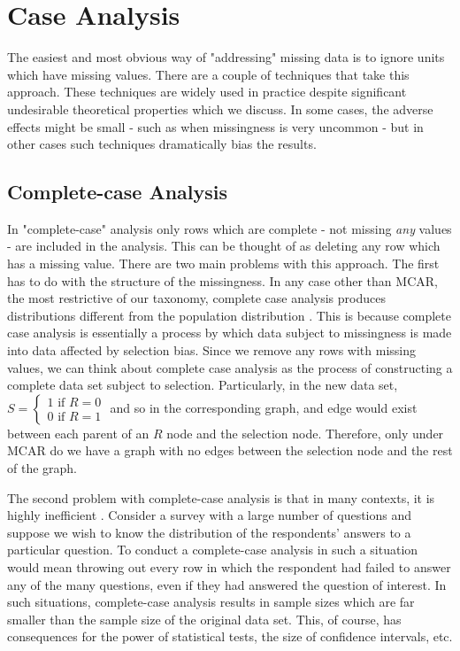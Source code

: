 \documentclass[12pt,twoside]{reedthesis}
\theoremstyle{definition}
\begin{document}
\section{Case Analysis}

The easiest and most obvious way of "addressing" missing data is to ignore units which have missing values. There are a couple of techniques that take this approach. These techniques are widely used in practice despite significant undesirable theoretical properties \citep{Little_1986} which we discuss. In some cases, the adverse effects might be small - such as when missingness is very uncommon - but in other cases such techniques dramatically bias the results. 

\subsection{Complete-case Analysis}
In "complete-case" analysis only rows which are complete - not missing \emph{any} values - are included in the analysis. This can be thought of as deleting any row which has a missing value. There are two main problems with this approach. The first has to do with the structure of the missingness. In any case other than MCAR, the most restrictive of our taxonomy, complete case analysis produces distributions different from the population distribution \citep{Little_1986}. This is because complete case analysis is essentially a process by which data subject to missingness is made into data affected by selection bias. Since we remove any rows with missing values, we can think about complete case analysis as the process of constructing a complete data set subject to selection. Particularly, in the new data set, $S= \begin{cases}1 \text{ if } R=0 \\ 0 \text{ if } R = 1 \end{cases}$ and so in the corresponding graph, and edge would exist between each parent of an $R$ node and the selection node. Therefore, only under MCAR do we have a graph with no edges between the selection node and the rest of the graph.

The second problem with complete-case analysis is that in many contexts, it is highly inefficient \citep{Little_1986}. Consider a survey with a large number of questions and suppose we wish to know the distribution of the respondents' answers to a particular question. To conduct a complete-case analysis in such a situation would mean throwing out every row in which the respondent had failed to answer any of the many questions, even if they had answered the question of interest. In such situations, complete-case analysis results in sample sizes which are far smaller than the sample size of the original data set. This, of course, has consequences for the power of statistical tests, the size of confidence intervals, etc. 
\end{document}
